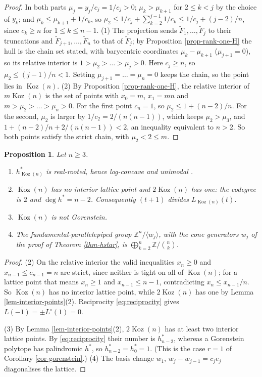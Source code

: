 \documentclass[11pt, a4paper, abstract=yes]{scrartcl}
\theoremstyle{definition}
\theoremstyle{remark}
\theoremstyle{plain}
\newtheorem{proposition}[definition]{Proposition}
\theoremstyle{remark}
\theoremstyle{plain}
\newcommand{\Koz}{\operatorname{Koz}}
\newcommand{\leannone}{\tikz[baseline=-0.6ex]\draw[leannone,line width=0.6pt] (0,0) circle (0.55ex);}
\newcommand{\leanmark}[1]{\leavevmode{\reversemarginpar\marginnote{\raggedleft#1}}}
\let\autocite\cite
\begin{document}
\begin{proof}
In both parts \(\mu_j=y_j/c_j=1/c_j>0\); \(\mu_k>\mu_{k+1}\) for \(2\le k<j\) by the choice of
\(y_k\); and \(\mu_k\le\mu_{k+1}+1/c_k\), so \(\mu_2\le1/c_j+\sum_{k=2}^{j-1}1/c_k\le1/c_j+(j-2)/n\),
since \(c_k\ge n\) for \(1\le k\le n-1\).
(1) The projection sends \(\tilde F_1,\dots,\tilde F_j\) to their truncations and
\(\tilde F_{j+1},\dots,\tilde F_n\) to that of \(\tilde F_j\); by Proposition \ref{prop-rank-one-H} the
hull is the chain set stated, with barycentric coordinates \(\mu_k-\mu_{k+1}\) (\(\mu_{j+1}=0\)), so its
relative interior is \(1>\mu_2>\dots>\mu_j>0\). Here \(c_j\ge n\), so \(\mu_2\le(j-1)/n<1\). Setting
\(\mu_{j+1}=\dots=\mu_n=0\) keeps the chain, so the point lies in \(\Koz(n)\).
(2) By Proposition \ref{prop-rank-one-H}, the relative interior of \(m\Koz(n)\) is the set of points
with \(x_0=m\), \(x_1=mn\) and \(m>\mu_2>\dots>\mu_n>0\). For the first point \(c_n=1\), so
\(\mu_2\le1+(n-2)/n\). For the second, \(\mu_2\) is larger by \(1/c_2=2/(n(n-1))\), which keeps
\(\mu_2>\mu_3\), and \(1+(n-2)/n+2/(n(n-1))<2\), an inequality equivalent to \(n>2\). So both points
satisfy the strict chain, with \(\mu_2<2\le m\).
\end{proof}

\begin{proposition}
\leanmark{\leannone}Let \(n\ge3\).
\begin{enumerate}
\item \(h^*_{\Koz(n)}\) is real-rooted, hence log-concave and unimodal \autocite{SavageVisontai2015}.
\item \(\Koz(n)\) has no interior lattice point and \(2\Koz(n)\) has one: the codegree is \(2\) and
\(\deg h^*=n-2\). Consequently \((t+1)\) divides \(L_{\Koz(n)}(t)\).
\item \(\Koz(n)\) is not Gorenstein.
\item The fundamental-parallelepiped group \(\mathbb Z^n/\langle w_j\rangle\), with the cone generators
\(w_j\) of the proof of Theorem \ref{thm-hstar}, is \(\bigoplus_{k=2}^n\mathbb Z/\binom nk\).
\end{enumerate}
\label{prop-hstar-props}
\end{proposition}

\begin{proof}
(2) On the relative interior the valid inequalities \(x_n\ge0\) and \(x_{n-1}\le c_{n-1}=n\) are
strict, since neither is tight on all of \(\Koz(n)\); for a lattice point that means \(x_n\ge1\) and
\(x_{n-1}\le n-1\), contradicting \(x_n\le x_{n-1}/n\). So \(\Koz(n)\) has no interior lattice point,
while \(2\Koz(n)\) has one by Lemma \ref{lem-interior-points}(2). Reciprocity \eqref{eq:reciprocity}
gives \(L(-1)=\pm L^\circ(1)=0\).

(3) By Lemma \ref{lem-interior-points}(2), \(2\Koz(n)\) has at least two interior lattice points. By
\eqref{eq:reciprocity} their number is \(h^*_{n-2}\), whereas a Gorenstein polytope has palindromic \(h^*\), so
\(h^*_{n-2}=h^*_0=1\). (This is the case \(r=1\) of Corollary \ref{cor-gorenstein}.)
(4) The basis change \(w_1\), \(w_j-w_{j-1}=c_je_j\) diagonalises the lattice.
\end{proof}
\end{document}
